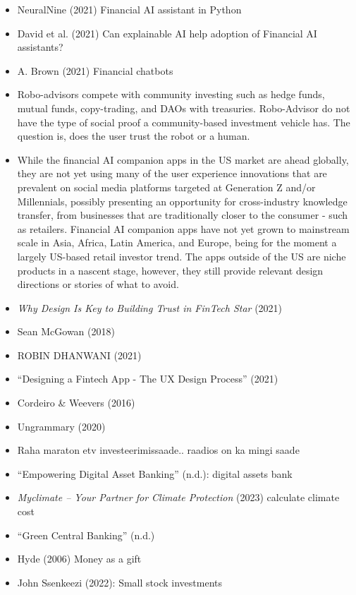 \documentclass[
  letterpaper,
  DIV=11,
  numbers=noendperiod]{scrartcl}
\begin{document}
\begin{itemize}
\item
  NeuralNine (2021) Financial AI assistant in Python
\item
  David et al. (2021) Can explainable AI help adoption of Financial AI
  assistants?
\item
  A. Brown (2021) Financial chatbots
\item
  Robo-advisors compete with community investing such as hedge funds,
  mutual funds, copy-trading, and DAOs with treasuries. Robo-Advisor do
  not have the type of social proof a community-based investment vehicle
  has. The question is, does the user trust the robot or a human.
\item
  While the financial AI companion apps in the US market are ahead
  globally, they are not yet using many of the user experience
  innovations that are prevalent on social media platforms targeted at
  Generation Z and/or Millennials, possibly presenting an opportunity
  for cross-industry knowledge transfer, from businesses that are
  traditionally closer to the consumer - such as retailers. Financial AI
  companion apps have not yet grown to mainstream scale in Asia, Africa,
  Latin America, and Europe, being for the moment a largely US-based
  retail investor trend. The apps outside of the US are niche products
  in a nascent stage, however, they still provide relevant design
  directions or stories of what to avoid.
\item
  \emph{Why Design Is Key to Building Trust in {FinTech} {\textbar}
  {Star}} (2021)
\item
  Sean McGowan (2018)
\item
  ROBIN DHANWANI (2021)
\item
  {``Designing a {Fintech App} - {The UX Design Process}''} (2021)
\item
  Cordeiro \& Weevers (2016)
\item
  Ungrammary (2020)
\item
  Raha maraton etv investeerimissaade.. raadios on ka mingi saade
\item
  {``Empowering {Digital Asset Banking}''} (n.d.): digital assets bank
\item
  \emph{Myclimate -- Your Partner for Climate Protection} (2023)
  calculate climate cost
\item
  {``Green {Central Banking}''} (n.d.)
\item
  Hyde (2006) Money as a gift
\item
  John Ssenkeezi (2022): Small stock investments

\end{itemize}
\end{document}
